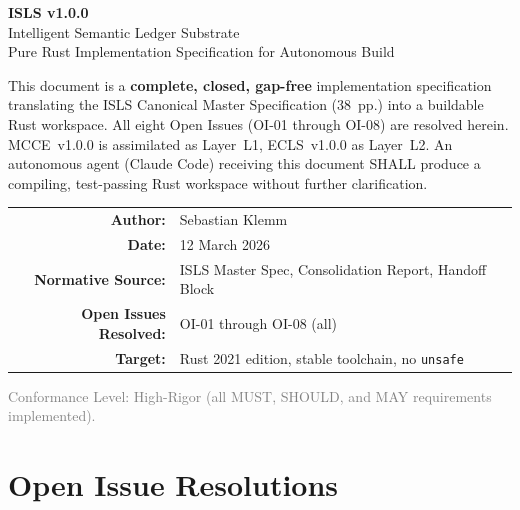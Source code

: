 \documentclass[10pt,a4paper]{article}
\theoremstyle{definition}\newtheorem{definition}{Def}[section]
\theoremstyle{plain}\newtheorem{theorem}{Thm}[section]
\begin{document}

\begin{titlepage}\centering\vspace*{1cm}
{\Huge\bfseries\color{sectioncolor}ISLS v1.0.0}\\[0.5cm]
{\LARGE\color{accent}Intelligent Semantic Ledger Substrate}\\[0.3cm]
{\large\color{accentdark}Pure Rust Implementation Specification for Autonomous Build}
\vspace{0.8cm}

\begin{tcolorbox}[colback=thmbg,colframe=thmborder,width=0.92\textwidth,arc=3pt]
\small\centering
This document is a \textbf{complete, closed, gap-free} implementation specification translating
the ISLS Canonical Master Specification (38~pp.) into a buildable Rust workspace.
All eight Open Issues (OI-01 through OI-08) are resolved herein.
MCCE~v1.0.0 is assimilated as Layer~L1, ECLS~v1.0.0 as Layer~L2.
An autonomous agent (Claude Code) receiving this document SHALL produce a compiling,
test-passing Rust workspace without further clarification.
\end{tcolorbox}
\vspace{0.6cm}
\begin{tabular}{rl}
\textbf{Author:} & Sebastian Klemm \\
\textbf{Date:} & 12 March 2026 \\
\textbf{Normative Source:} & ISLS Master Spec, Consolidation Report, Handoff Block \\
\textbf{Open Issues Resolved:} & OI-01 through OI-08 (all) \\
\textbf{Target:} & Rust 2021 edition, stable toolchain, no \texttt{unsafe} \\
\end{tabular}
\vfill
{\scriptsize\textcolor{gray}{Conformance Level: High-Rigor (all MUST, SHOULD, and MAY requirements implemented).}}
\end{titlepage}

\tableofcontents\newpage

\section{Open Issue Resolutions}
\label{sec:oi}
\end{document}

